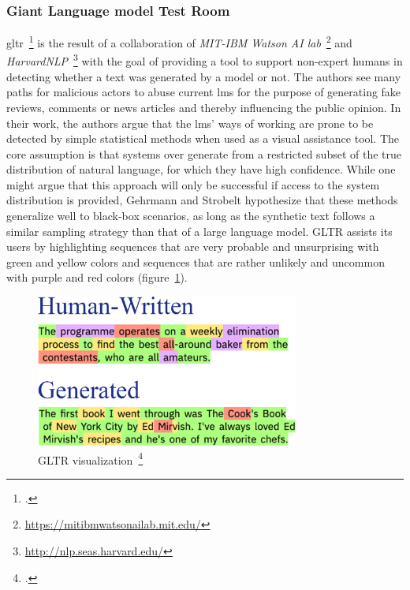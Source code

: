 \subsubsection{Giant Language model Test Room}
\label{sub:gltr}

\gls{gltr}~\footcite{DBLP:journals/corr/abs-1906-04043} is the result of a collaboration of \textit{MIT-IBM Watson AI lab}~\footnote{\url{https://mitibmwatsonailab.mit.edu/}} and \textit{HarvardNLP}~\footnote{\url{http://nlp.seas.harvard.edu/}} with the goal of providing a tool to support non-expert humans in detecting whether a text was generated by a model or not. The authors see many paths for malicious actors to abuse current \gls{lm}s for the purpose of generating fake reviews, comments or news articles and thereby influencing the public opinion. In their work, the authors argue that the \gls{lm}s' ways of working are prone to be detected by simple statistical methods when used as a visual assistance tool. The core assumption is that systems over generate from a restricted subset of the true distribution of natural language, for which they have high confidence. While one might argue that this approach will only be successful if access to the system distribution is provided, Gehrmann and Strobelt hypothesize that these methods generalize well to black-box scenarios, as long as the synthetic text follows a similar sampling strategy than that of a large language model. GLTR assists its users by highlighting sequences that are very probable and unsurprising with green and yellow colors and sequences that are rather unlikely and uncommon with purple and red colors (figure~\ref{fig:gltr}).

\begin{figure}[h]
  	\includegraphics[height=5cm]{img/gltr}
  	\caption[GLTR visualization]{GLTR visualization~\footcite{DBLP:journals/corr/abs-1906-04043}}
	\label{fig:gltr}
\end{figure}

